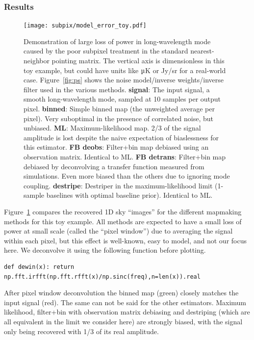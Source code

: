 \documentclass[twocolumn,apj]{aastex63}
\newcommand{\dfn}[1]{\textbf{#1}}
\begin{document}
\subsubsection{Results}
\begin{figure}
	\centering
	\hspace*{-5mm}\texttt{[image: subpix/model\_error\_toy.pdf]}
	\caption{
		Demonstration of large loss of power in long-wavelength mode
		caused by the poor subpixel treatment in the standard nearest-neighbor pointing matrix.
		The vertical axis is dimensionless in this toy example, but
		could have units like $\micro$K or Jy/sr for a real-world case.
		Figure~\ref{fig:ps} shows the noise model/inverse weights/inverse filter
		used in the various methods.
		\dfn{signal}: The input signal, a smooth long-wavelength mode,
		sampled at 10 samples per output pixel.
		\dfn{binned}: Simple binned map (the unweighted average per pixel).
		Very suboptimal in the presence of correlated noise, but unbiased.
		\dfn{ML}: Maximum-likelihood map. 2/3 of the signal amplitude is lost despite
		the naive expectation of biaslessness for this estimator.
		\dfn{FB deobs}: Filter+bin map debiased using an observation matrix.
		Identical to ML.
		\dfn{FB detrans}: Filter+bin map debiased by deconvolving a
		transfer function measured from simulations. Even more biased
		than the others due to ignoring mode coupling.
		\dfn{destripe}: Destriper in the maximum-likelihood limit
		(1-sample baselines with optimal baseline prior). Identical to ML.
	}
	\label{fig:subpix-bias}
\end{figure}

Figure~\ref{fig:subpix-bias} compares the recovered 1D sky ``images''
for the different mapmaking methods for this toy example. All methods
are expected to have a small loss of power at small scale (called
the ``pixel window'') due to averaging the signal within each pixel,
but this effect is well-known, easy to model, and not our focus here.
We deconvolve it using the following function before plotting.
\begin{lstlisting}
def dewin(x): return np.fft.irfft(np.fft.rfft(x)/np.sinc(freq),n=len(x)).real
\end{lstlisting}
After pixel window deconvolution the binned map (green) closely matches the
input signal (red). The same can not be said for the other estimators.
Maximum likelihood, filter+bin with observation matrix debiasing and destriping
(which are all equivalent in the limit we consider here) are strongly biased,
with the signal only being recovered with 1/3 of its real amplitude.
\end{document}

